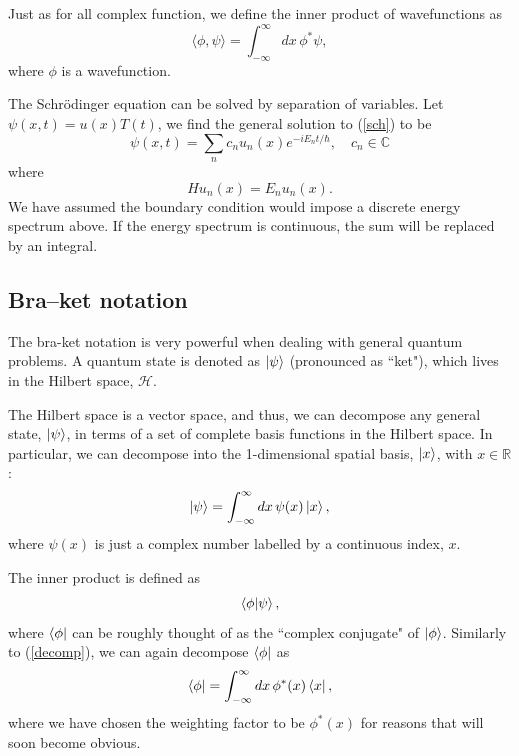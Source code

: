\documentclass[12pt,a4paper]{article}
\begin{document}
Just as for all complex function, we define the inner product of wavefunctions as
\begin{equation}
    \langle\phi,\psi\rangle = \int^\infty_{-\infty}dx \, \phi^*\psi,
\end{equation}
where $\phi$ is a wavefunction.

The Schrödinger equation can be solved by separation of variables. Let $\psi(x,t)=u(x)T(t)$, we find the general solution to (\ref{sch}) to be
\begin{equation}
    \psi(x,t) = \sum_nc_nu_n(x)e^{-iE_nt/\hbar},\quad c_n\in \mathbb{C}
\end{equation}
where 
\begin{equation}
    Hu_n(x) = E_nu_n(x).
\end{equation}
We have assumed the boundary condition would impose a discrete energy spectrum above. If the energy spectrum is continuous, the sum will be replaced by an integral. 

\subsection{Bra–ket notation}
\label{Sec:Bra-ket}
The bra-ket notation is very powerful when dealing with general quantum problems.
A quantum state is denoted as $\ket{\psi}$ (pronounced as ``ket"), which lives in the Hilbert space, $\mathcal{H}$. 

The Hilbert space is a vector space, and thus, we can decompose any general state, $\ket{\psi}$, in terms of a set of complete basis functions in the Hilbert space. In particular, we can decompose into the 1-dimensional spatial basis, $\ket{x}$, with $x\in \mathbb{R}$:
\begin{equation}
    \ket{\psi} = \int^\infty_{-\infty}dx\,\psi(x)\ket{x},
    \label{decomp}
\end{equation}
where $\psi(x)$ is just a complex number labelled by a continuous index, $x$.

The inner product is defined as 
\begin{equation}
    \braket{\phi}{\psi},
    \label{i}
\end{equation}
where $\bra{\phi}$ can be roughly thought of as the ``complex conjugate" of $\ket{\phi}$. Similarly to (\ref{decomp}), we can again decompose $\bra{\phi}$ as
\begin{equation}
    \bra{\phi} = \int^\infty_{-\infty}dx\,\phi^*(x)\bra{x},
\end{equation}
where we have chosen the weighting factor to be $\phi^*(x)$ for reasons that will soon become obvious.
\end{document}
